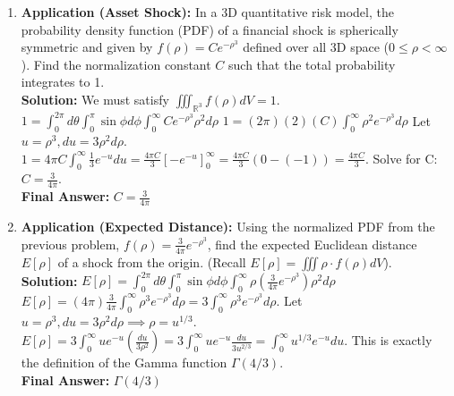 \documentclass[11pt]{article}
\begin{document}
\begin{enumerate}[label=\textbf{\arabic*.}]
\item \textbf{Application (Asset Shock):} In a 3D quantitative risk model, the probability density function (PDF) of a financial shock is spherically symmetric and given by $f(\rho) = C e^{-\rho^3}$ defined over all 3D space ($0 \le \rho < \infty$). Find the normalization constant $C$ such that the total probability integrates to 1.\\
\textbf{Solution:}
We must satisfy $\iiint_{\mathbb{R}^3} f(\rho) dV = 1$.
$1 = \int_0^{2\pi} d\theta \int_0^\pi \sin\phi d\phi \int_0^\infty C e^{-\rho^3} \rho^2 d\rho$
$1 = (2\pi) (2) (C) \int_0^\infty \rho^2 e^{-\rho^3} d\rho$
Let $u=\rho^3, du=3\rho^2 d\rho$.
$1 = 4\pi C \int_0^\infty \frac{1}{3} e^{-u} du = \frac{4\pi C}{3} [-e^{-u}]_0^\infty = \frac{4\pi C}{3} (0 - (-1)) = \frac{4\pi C}{3}$.
Solve for C: $C = \frac{3}{4\pi}$.\\
\textbf{Final Answer:} $C = \frac{3}{4\pi}$

\item \textbf{Application (Expected Distance):} Using the normalized PDF from the previous problem, $f(\rho) = \frac{3}{4\pi} e^{-\rho^3}$, find the expected Euclidean distance $E[\rho]$ of a shock from the origin. (Recall $E[\rho] = \iiint \rho \cdot f(\rho) dV$).\\
\textbf{Solution:}
$E[\rho] = \int_0^{2\pi} d\theta \int_0^\pi \sin\phi d\phi \int_0^\infty \rho \left(\frac{3}{4\pi} e^{-\rho^3}\right) \rho^2 d\rho$
$E[\rho] = (4\pi) \frac{3}{4\pi} \int_0^\infty \rho^3 e^{-\rho^3} d\rho = 3 \int_0^\infty \rho^3 e^{-\rho^3} d\rho$.
Let $u=\rho^3, du=3\rho^2 d\rho \implies \rho = u^{1/3}$.
$E[\rho] = 3 \int_0^\infty u e^{-u} (\frac{du}{3\rho^2}) = 3 \int_0^\infty u e^{-u} \frac{du}{3u^{2/3}} = \int_0^\infty u^{1/3} e^{-u} du$.
This is exactly the definition of the Gamma function $\Gamma(4/3)$.\\
\textbf{Final Answer:} $\Gamma(4/3)$


\end{enumerate}
\end{document}
